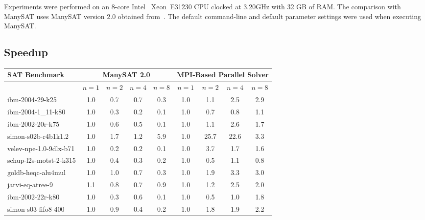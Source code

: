\documentclass[letterpaper, compsoc, conference]{IEEEtran}
\begin{document}
Experiments were performed on an 8-core Intel\textregistered
~Xeon\textregistered ~E31230 CPU clocked at 3.20GHz with 32 GB of RAM. The
comparison with ManySAT uses ManySAT version 2.0 obtained
from~\cite{ManySATWeb}.  The default command-line and default parameter
settings were used when executing ManySAT.


\subsection{Speedup}
\begin{table*}[htbp]
    \begin{center}
    \begin{tabular}{|l|c|c|c|c|c|c|c|c|}
        \hline
        {\textbf{SAT Benchmark}} & \multicolumn{4}{c|}{\bf ManySAT 2.0} & \multicolumn{4}{c|}{\bf MPI-Based Parallel Solver} \\
        \hline
        & $n=1$ & $n=2$ & $n=4$ & $n=8$ & $n=1$ & $n=2$ & $n=4$ & $n=8$ \\
        \hline
        ibm-2004-29-k25                          &    1.0 &    0.7 &    0.7 &    0.3 &    1.0 &    1.1 &    2.5 &    2.9 \\
        ibm-2004-1\_11-k80                       &    1.0 &    0.3 &    0.2 &    0.1 &    1.0 &    0.7 &    0.8 &    1.1 \\
        ibm-2002-20r-k75                         &    1.0 &    0.6 &    0.5 &    0.1 &    1.0 &    1.1 &    2.6 &    1.7 \\
        simon-s02b-r4b1k1.2                      &    1.0 &    1.7 &    1.2 &    5.9 &    1.0 &   25.7 &   22.6 &    3.3 \\
        velev-npe-1.0-9dlx-b71                   &    1.0 &    0.2 &    0.2 &    0.1 &    1.0 &    3.7 &    1.7 &    1.6 \\
        schup-l2s-motst-2-k315                   &    1.0 &    0.4 &    0.3 &    0.2 &    1.0 &    0.5 &    1.1 &    0.8 \\
        goldb-heqc-alu4mul                       &    1.0 &    1.0 &    0.7 &    0.3 &    1.0 &    1.9 &    3.3 &    3.0 \\
        jarvi-eq-atree-9                         &    1.1 &    0.8 &    0.7 &    0.9 &    1.0 &    1.2 &    2.5 &    2.0 \\
        ibm-2002-22r-k80                         &    1.0 &    0.3 &    0.6 &    0.1 &    1.0 &    0.5 &    1.0 &    1.8 \\
        simon-s03-fifo8-400                      &    1.0 &    0.9 &    0.4 &    0.2 &    1.0 &    1.8 &    1.9 &    2.2 \\

\end{tabular}
\end{center}
\end{table*}
\end{document}
